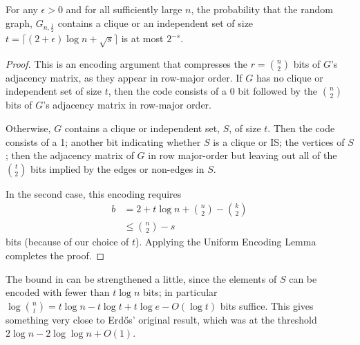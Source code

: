 \documentclass[lotsofwhite]{patmorin}
\begin{document}
\begin{thm}
For any $\epsilon>0$ and for all sufficiently large $n$, the probability
that the random graph, $G_{n,\frac{1}{2}}$ contains a clique or an
independent set of size $t = \lceil(2+\epsilon)\log n + \sqrt{s}\rceil$
is at most $2^{-s}$.
\end{thm}

\begin{proof}
This is an encoding argument that compresses the $r=\binom{n}{2}$ bits
of $G$'s adjacency matrix, as they appear in row-major order.  If $G$
has no clique or independent set of size $t$, then the code consists of
a 0 bit followed by the $\binom{n}{2}$ bits of $G$'s adjacency matrix
in row-major order.

Otherwise, $G$ contains a clique or independent set, $S$, of size $t$.
Then the code consists of a 1; another bit indicating whether $S$ is a
clique or IS; the vertices of $S$; then the adjacency matrix of $G$ in
row major-order but leaving out all of the $\binom{t}{2}$ bits implied
by the edges or non-edges in $S$.

In the second case, this encoding requires 
\begin{align*}
   b & = 2 + t\log n + \binom{n}{2}-\binom{k}{2} \\
     & \le \binom{n}{2} - s 
\end{align*}
bits (because of our choice of $t$).   Applying the Uniform Encoding
Lemma completes the proof.
\end{proof}

\begin{rem}
The bound in  can be strengthened a little, since
the elements of $S$ can be encoded with fewer than $t\log n$ bits; in
particular $\log\binom{n}{t}=t\log n - t\log t + t\log e - O(\log t)$
bits suffice.  This gives something very close to Erdős' original result,
which was at the threshold $2\log n - 2\log\log n + O(1)$.
\end{rem}
\end{document}
